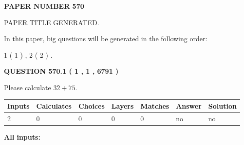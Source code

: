 \documentclass[12pt]{article}
\begin{document}
   
   
   
\newpage 
\setcounter{page}{ 
   570001 } 
   
   
   
   
 {\textbf{ \Large{ PAPER NUMBER  570  }}}
   
   
\vspace{0.2in}
   
   
   
   
   
   
   
   
 \vspace{0.2in}
 
 
 
 
   
   
 PAPER TITLE GENERATED.
   
   
   
\vspace{0.2in}
   
In this paper, big questions will be generated in the following order: 
   
   
   1 ( 1 )
 ,
   2 ( 2 )
 .
  
\vspace{0.2in}
  
{\textbf{\Large{QUESTION
570.1 
 ( 1 , 1 , 6791 )
}}}
  
  
 
Please calculate $ %
32 +  %
75 $.
 
 
   
   
   
   
\noindent\begin{tabular}{|l|l|l|l|l|l|l|}
 \hline
Inputs & Calculates & Choices & Layers & Matches & Answer & Solution \\ \hline
 2  & 
 0  & 
 0
  & 
 0  & 
 0  & 
  no & 
  no 
  \\ \hline
 \end{tabular}
   
   
   
   
\noindent{}
   
   
   
   
\noindent\vspace{0.1in}\hspace{-0.08in} {\textbf{\Large{All inputs: }}}
   
   
  
\end{document}
